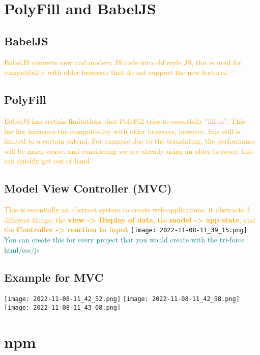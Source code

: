 \documentclass[main.tex,fontsize=6pt,paper=a4,paper=landscape,DIV=calc,]{scrartcl}
\begin{document}
\begin{multicols*}{4}
\section{PolyFill and BabelJS}

\subsection{BabelJS}  
\textcolor{orange}{BabelJS converts new and modern JS code into old style JS, this is used for compatibility with older browsers that do not support the new features.}

\subsection{PolyFill} 
\textcolor{orange}{BabelJS has certain limitations that PolyFill tries to essentially "fill in". This further increases the compatibility with older browsers, however, this still is limited to a certain extend.\newline
For example due to the translating, the performance will be much worse, and considering we are already using an older browser, this can quickly get out of hand.}

\subsection{Model View Controller (MVC)}  
\textcolor{orange}{This is essentially an abstract system to create web-applications, it abstracts 3 different things: the \textbf{view -> Display of data}, the \textbf{model -> app state}, and the \textbf{Controller -> reaction to input}}\newline
\texttt{[image: 2022-11-08-11\_39\_15.png]}\newline
\textcolor{teal}{You can create this for every project that you would create with the tri-force html/css/js}

\subsection{Example for MVC}  
\texttt{[image: 2022-11-08-11\_42\_52.png]}\newline
\texttt{[image: 2022-11-08-11\_42\_58.png]}
\texttt{[image: 2022-11-08-11\_43\_08.png]}


\section{npm}


\end{multicols*}
\end{document}
